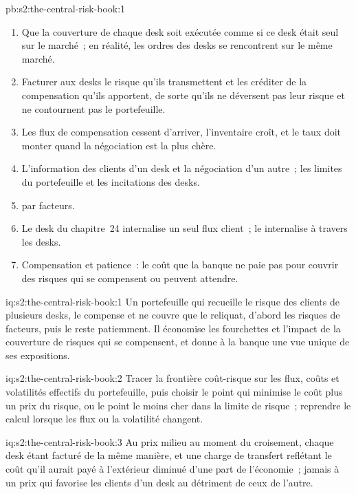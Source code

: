 \begin{solution}{pb:s2:the-central-risk-book:1}
\begin{enumerate}
écart-type quotidien du P\&L de 369\,000~\$.
\item Que la couverture de chaque desk soit exécutée comme si ce desk était seul sur le marché~; en réalité, les ordres des desks se rencontrent sur le même marché.
\item Facturer aux desks le risque qu'ils transmettent et les créditer de la compensation qu'ils apportent, de sorte qu'ils ne déversent pas leur risque et ne contournent pas le portefeuille.
\item Les flux de compensation cessent d'arriver, l'inventaire croît, et le taux doit monter quand la négociation est la plus chère.
\item L'information des clients d'un desk et la négociation d'un autre~; les limites du portefeuille et les incitations des desks.
\item {} par facteurs.
\item Le desk du chapitre~24 internalise un seul flux client~; le  internalise à travers les desks.
\item Compensation et patience~: le coût que la banque ne paie pas pour couvrir des risques qui se compensent ou peuvent attendre.
\end{enumerate}
\end{solution}

\begin{solution}{iq:s2:the-central-risk-book:1}
Un portefeuille qui recueille le risque des clients de plusieurs desks, le compense et ne couvre que le reliquat, d'abord les risques de facteurs, puis le reste patiemment. Il économise les
fourchettes et l'impact de la couverture de risques qui se compensent, et donne à la banque une vue unique de ses expositions.
\end{solution}

\begin{solution}{iq:s2:the-central-risk-book:2}
Tracer la frontière coût-risque sur les flux, coûts et volatilités effectifs du portefeuille, puis choisir le point qui minimise le coût plus un prix du risque, ou le
point le moins cher dans la limite de risque~; reprendre le calcul lorsque les flux ou la volatilité changent.
\end{solution}

\begin{solution}{iq:s2:the-central-risk-book:3}
Au prix milieu au moment du croisement, chaque desk étant facturé de la même manière, et une charge de transfert reflétant le coût qu'il aurait payé à l'extérieur
diminué d'une part de l'économie~; jamais à un prix qui favorise les clients d'un desk au détriment de ceux de l'autre.
\end{solution}

